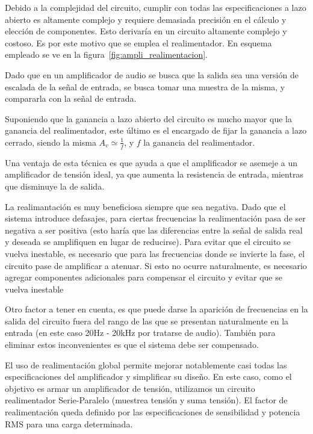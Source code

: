\documentclass[a4paper,12pt,twoside]{article}
\begin{document}
Debido a la complejidad del circuito, cumplir con todas las especificaciones a lazo abierto es altamente complejo y requiere demasiada precisión en el cálculo y elección de componentes. Esto derivaría en un circuito altamente complejo y costoso. Es por este motivo que se emplea el realimentador. En esquema empleado se ve en la figura~\ref{fig:ampli_realimentacion}.

Dado que en un amplificador de audio se busca que la salida sea una versión de escalada de la señal de entrada, se busca tomar una muestra de la misma, y compararla con la señal de entrada. 

Suponiendo que la ganancia a lazo abierto del circuito es mucho mayor que la ganancia del realimentador, este último es el encargado de fijar la ganancia a lazo cerrado, siendo la misma $A_v \simeq \frac{1}{f}$, y $f$ la ganancia del realimentador.

Una ventaja de esta técnica es que ayuda a que el amplificador se asemeje a un amplificador de tensión ideal, ya que aumenta la resistencia de entrada, mientras que disminuye la de salida. 

La realimantación es muy beneficiosa siempre que sea negativa. Dado que el sistema introduce defasajes, para ciertas frecuencias la realimentación pasa de ser negativa a ser positiva (esto haría que las diferencias entre la señal de salida real y deseada se amplifiquen en lugar de reducirse). Para evitar que el circuito se vuelva inestable, es necesario que para las frecuencias donde se invierte la fase, el circuito pase de amplificar a atenuar. Si esto no ocurre naturalmente, es necesario agregar componentes adicionales para compensar el circuito y evitar que se vuelva inestable

Otro factor a tener en cuenta, es que puede darse la aparición de frecuencias en la salida del circuito fuera del rango de las que se presentan naturalmente en la entrada (en este caso 20Hz - 20kHz por tratarse de audio). También para eliminar estos inconvenientes es que el sistema debe ser compensado.

El uso de realimentación global permite mejorar notablemente casi todas las especificaciones del amplificador y simplificar su diseño. En este caso, como el objetivo es armar un amplificador de tensión, utilizamos un circuito realimentador Serie-Paralelo (muestrea tensión y suma tensión). El factor de realimentación queda definido por las especificaciones de sensibilidad y potencia RMS para una carga determinada.
\end{document}
